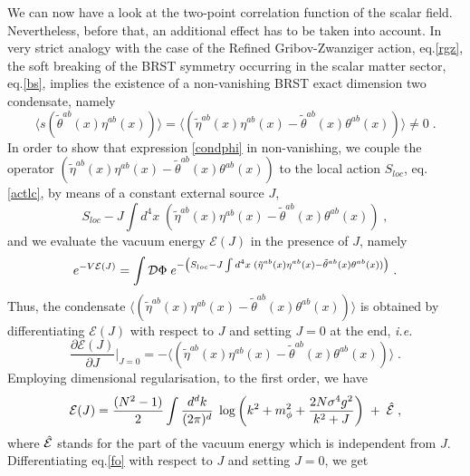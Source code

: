 We can now have a look at the two-point correlation function of the scalar field. Nevertheless, before that, an additional effect has to be taken into account. In very strict analogy with the case of the Refined Gribov-Zwanziger action, eq.\eqref{rgz}, the soft breaking of the BRST symmetry occurring in the scalar matter sector, eq.\eqref{bs}, implies the existence of a non-vanishing BRST exact dimension two condensate, namely 
\begin{equation}
\langle s ( \tilde{\theta}^{ab}(x)  {\eta}^{ab}(x) ) \rangle = \langle ( \tilde{\eta}^{ab}(x)  {\eta}^{ab}(x)  -  \tilde{\theta}^{ab}(x)  {\theta}^{ab}(x) ) \rangle \neq 0 \;.  \label{condphi}
\end{equation}
In order to show that expression \eqref{condphi} in non-vanishing, we couple the operator $( \tilde{\eta}^{ab}(x)  {\eta}^{ab}(x)  -  \tilde{\theta}^{ab}(x)  {\theta}^{ab}(x) ) $ to the local action $S_{ loc}$, eq.\eqref{actlc}, by means of a constant external source $J$, 
\begin{equation}
S_{ loc} - J \int d^4x\;  ( \tilde{\eta}^{ab}(x)  {\eta}^{ab}(x)  -  \tilde{\theta}^{ab}(x)  {\theta}^{ab}(x) )  \;, \label{cj}
\end{equation}
and we evaluate the vacuum energy $\mathcal{E}(J)$ in the presence of $J$, namely 
\begin{equation}
 e^{-V\mathcal{E}(J)}= \int {\cal D}{\Phi} \; e^{ -\left( S_{ loc} - J \int d^4x\;  ( \tilde{\eta}^{ab}(x)  {\eta}^{ab}(x)  -  \tilde{\theta}^{ab}(x)  {\theta}^{ab}(x) ) \right) }   \;. \label{ej}
\end{equation}
Thus, the condensate $\langle ( \tilde{\eta}^{ab}(x)  {\eta}^{ab}(x)  -  \tilde{\theta}^{ab}(x)  {\theta}^{ab}(x) ) \rangle$  is obtained by differentiating $\mathcal{E}(J)$ with respect to $J$ and setting $J=0$ at the end, {\it i.e.}
\begin{equation}
\frac{\partial \mathcal{E}(J)}{\partial J} \Big|_{J=0} = - \langle ( \tilde{\eta}^{ab}(x)  {\eta}^{ab}(x)  -  \tilde{\theta}^{ab}(x)  {\theta}^{ab}(x) ) \rangle    \;. \label{vj}
\end{equation}
Employing dimensional regularisation, to the first order, we have 
\begin{equation}
\mathcal{E}(J) = \frac{(N^2-1)}{2} \int \frac{ d^dk}{(2\pi)^d} \; \log\left( k^2 +m^2_{\phi} +\frac{2N\sigma^4 g^2}{k^2+J} \right)  \; + \;{\hat {\cal E}}   \;, \label{fo}
\end{equation}
where ${\hat {\cal E}} $ stands for the part of the vacuum energy which is independent from $J$. Differentiating eq.\eqref{fo} with respect to $J$ and setting $J=0$, we get 

